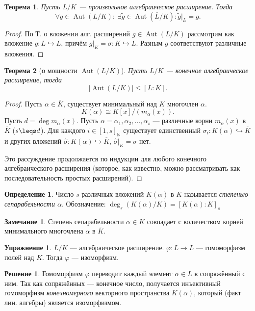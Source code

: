 \documentclass[12pt]{article}%
\newcommand{\N}{\ensuremath{\mathbb N}}
\renewcommand{\phi}{\varphi}
\newcommand{\ol}{\overline}
\newcommand{\hto}{\hookrightarrow}
\DeclareMathOperator{\Aut}{Aut}
\newtheorem{Thm}{Теорема}[section]
\theoremstyle{remark}
\theoremstyle{definition}
\newtheorem{Exec}{Упражнение}
\newtheorem*{Sol}{Решение}
\newtheorem*{Remark}{Замечание}
\newtheorem{Def}{Определение}[section]
\begin{document}
\begin{Thm}
Пусть $L/K$ — произвольное алгебраическое расширение. Тогда
$$
    \forall g \in \Aut(L/K) \colon \; 
    \exists \tilde{g} \in \Aut(\overline{L} / K)\colon \tilde{g}|_L = g.  
$$ 
\end{Thm}
\begin{proof}
По Т. о вложении алг. расширений $g \in \Aut(L / K)$ рассмотрим как вложение $g
\colon L \hto \overline L$, причём $g|_K = \sigma \colon K \hto \ol L$. Разным
$g$ соответствуют различные вложения.
\end{proof}

\begin{Thm}[о мощности $\Aut(L/K)$]
Пусть $L / K$ — конечное алгебраическое расширение, тогда
$$
    |\Aut(L/ K) | \leqslant [L:K]. 
$$
\end{Thm}
\begin{proof}
Пусть $\alpha \in \ol K$, существует минимальный над $K$ многочлен $\alpha$.
$$
    K(\alpha) \cong K[x] / (m_\alpha (x)).
$$
Пусть $d = \deg m_\alpha(x)$. Пусть $\alpha = \alpha_1, \alpha_2, \ldots ,
\alpha_s$ — различные корни $m_\alpha(x)$ в $\ol K$ ($s \leqs d$). Для
каждого $i \in [1,s]_\N$ существует единственный $\sigma_i \colon K(\alpha)
\hto \ol K$ и других вложений $\hat \sigma \colon K(\alpha) \hto \ol K$, $\hat
\sigma |_K = \sigma$ нет.

Это рассуждение продолжается по индукции для любого конечного алгебраического
расширения (которое, как известно, можно рассматривать как последовательность
простых расширений).
\end{proof}

\begin{Def}
Число $s$ различных вложений $K(\alpha)$ в $\ol K$ называется \emph{степенью
сепарабельности $\alpha$}. Обозначение: $\deg_s(K(\alpha) / K) = [K(\alpha) :
K]_s$
\end{Def}

\begin{Remark}
Степень сепарабельности $\alpha \in K$ совпадает с количеством корней
минимального многочлена $\alpha$ в $\ol K$.
\end{Remark}

\begin{Exec}
$L/K$ — алгебраическое расширение. $\phi\colon L \to L$ — гомоморфизм полей над
$K$. Тогда $\phi$ — изоморфизм.
\end{Exec}

\begin{Sol}
Гомоморфизм $\phi$ переводит каждый элемент $\alpha\in L$ в сопряжённый с ним.
Так как сопряжённых — конечное число, получается инъективный гомоморфизм
\emph{конечномерного} векторного пространства $K(\alpha)$, который (факт лин.
алгебры) является изоморфизмом.
\end{Sol}
\end{document}
